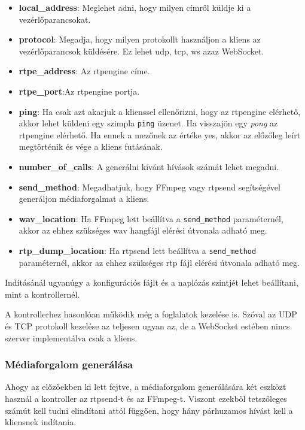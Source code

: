 \begin{itemize}
	\item \textbf{local\_address}: Meglehet adni, hogy milyen címről küldje
	ki a vezérlőparancsokat.
	\item \textbf{protocol}: Megadja, hogy milyen protokollt használjon a kliens az
	vezérlőparancsok küldésére. Ez lehet udp, tcp, ws azaz WebSocket.
	\item \textbf{rtpe\_address}: Az rtpengine címe. 
	\item \textbf{rtpe\_port}:Az rtpengine portja.
	\item \textbf{ping}: Ha csak azt akarjuk a klienssel ellenőrizni, hogy az rtpengine
	elérhető, akkor lehet küldeni egy szimpla \texttt{ping} üzenet. Ha visszajön egy
	\textit{pong} az rtpengine elérhető. Ha ennek a mezőnek az értéke yes, akkor 
	az előzőleg leírt megtörténik és vége a kliens futásának. 
	\item \textbf{number\_of\_calls}: A generálni kívánt hívások számát lehet megadni. 
	\item \textbf{send\_method}: Megadhatjuk, hogy FFmpeg vagy rtpsend segítségével
	generáljon médiaforgalmat a kliens.
	\item \textbf{wav\_location}: Ha FFmpeg lett beállítva a \texttt{send\_method} 
	paraméternél, akkor az ehhez szükséges wav hangfájl elérési útvonala adható meg.
	\item \textbf{rtp\_dump\_location}: Ha rtpsend lett beállítva a 
	\texttt{send\_method} paraméternél, akkor az ehhez szükséges rtp fájl elérési 
	útvonala adható meg.
\end{itemize}

Indításánál ugyanúgy a konfigurációs fájlt és a naplózás szintjét lehet beállítani,
mint a kontrollernél. 

A kontrollerhez hasonlóan működik még a foglalatok kezelése is. Szóval az UDP és TCP 
protokoll kezelése az teljesen ugyan az, de a WebSocket estében nincs szerver 
implementálva csak a kliens. 

\subsubsection{Médiaforgalom generálása}

Ahogy az előzőekben ki lett fejtve, a médiaforgalom generálására két eszközt 
használ a kontroller az rtpsend-t és az FFmpeg-t. Viszont ezekből tetszőleges
számút kell tudni elindítani attól függően, hogy hány párhuzamos hívást kell 
a kliensnek indítania.

